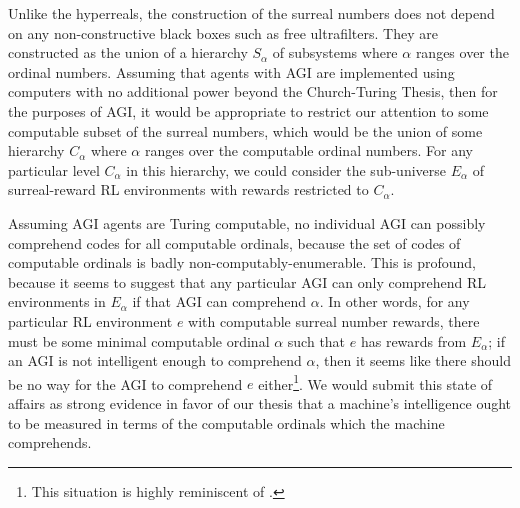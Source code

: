 \documentclass[reqno]{article}
\theoremstyle{definition}
\begin{document}

Unlike the hyperreals,
the construction of the surreal numbers does not depend on any
non-constructive black boxes such as free ultrafilters.
They are constructed as the union of a hierarchy $S_\alpha$ of subsystems where
$\alpha$ ranges over the ordinal numbers. Assuming that agents with AGI are
implemented using computers with no additional power beyond the Church-Turing
Thesis, then for the purposes of AGI, it would be appropriate to restrict our
attention to some computable subset of the surreal numbers, which would be the union of
some hierarchy $C_\alpha$ where $\alpha$ ranges over the computable ordinal numbers.
For any particular level $C_\alpha$ in this hierarchy, we could consider the
sub-universe $E_\alpha$ of surreal-reward RL environments with rewards restricted
to $C_\alpha$.

Assuming AGI agents are Turing computable,
no individual AGI can possibly comprehend codes for all computable ordinals, because
the set of codes of computable ordinals is badly non-computably-enumerable.
This is profound, because it seems to suggest that any particular AGI can
only comprehend RL environments in $E_\alpha$ if that AGI can comprehend $\alpha$.
In other words, for any particular RL environment $e$ with computable surreal number
rewards, there must be some minimal computable ordinal $\alpha$ such that $e$ has
rewards from $E_\alpha$; if an AGI is not intelligent enough to comprehend $\alpha$,
then it seems like there should be no way for the AGI to comprehend $e$
either\footnote{This situation is highly reminiscent of \cite{hibbard2011measuring}.}.
We would submit
this state of affairs as strong evidence in favor of our thesis
\cite{alexander2019measuring} that a machine's intelligence ought to be measured
in terms of the computable ordinals which the machine comprehends.
\end{document}
